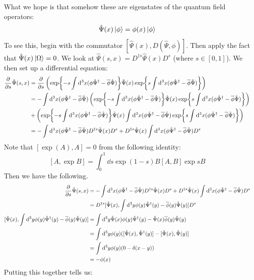 \documentclass{article}
\begin{document}
What we hope is that somehow these are eigenstates of the quantum field operators:
\begin{equation}
\hat\Psi(x)\ket{\phi} = \phi(x) \ket{\phi}
\end{equation}
To see this, begin with the commutator $[\hat\Psi(x),D(\hat\Psi,\phi)]$. Then apply the fact that $\hat\Psi(x)\ket{\Omega}=0$. We look at $\hat\Psi(s,x) = D^{\dagger s}\hat \Psi(x)D^s$ (where $s \in [0,1]$). We then set up a differential equation:
\begin{align*}
\pdv{s}\hat\Psi(s,x) &= \pdv{s}\left(\exp{-s\int \dd^3 x (\phi\hat\Psi^\dagger-\overline\phi\hat\Psi)} \hat\Psi(x) \exp{s\int \dd^3 x (\phi\hat\Psi^\dagger-\overline\phi\hat\Psi)}\right)\\
&= -\int \dd^3 x (\phi\hat\Psi^\dagger-\overline\phi\hat\Psi) \left(\exp{-s\int \dd^3 x (\phi\hat\Psi^\dagger-\overline\phi\hat\Psi)} \hat\Psi(x) \exp{s\int \dd^3 x (\phi\hat\Psi^\dagger-\overline\phi\hat\Psi)}\right)\\
&+\left(\exp{-s\int \dd^3 x (\phi\hat\Psi^\dagger-\overline\phi\hat\Psi)}\hat\Psi(x)  \int \dd^3 x (\phi\hat\Psi^\dagger-\overline\phi\hat\Psi) \exp{s\int \dd^3 x (\phi\hat\Psi^\dagger-\overline\phi\hat\Psi)}\right)\\
&= -\int \dd^3 x (\phi\hat\Psi^\dagger-\overline\phi\hat\Psi) D^{\dagger s} \hat\Psi(x)D^s+ D^{\dagger s}\hat\Psi(x)\int \dd^3 x (\phi\hat\Psi^\dagger-\overline\phi\hat\Psi)D^s
\end{align*}
Note that $[\exp(A),A] = 0$ from the following identity:
\[[A,\exp{B}]= \int_0^1 \dd s \exp{(1-s)B}[A,B]\exp{sB}\]
Then we have the following.
\begin{align*}
\pdv{s}\hat\Psi(s,x) &= -\int \dd^3 x (\phi\hat\Psi^\dagger-\overline\phi\hat\Psi) D^{\dagger s} \hat\Psi(x)D^s+ D^{\dagger s}\hat\Psi(x)\int \dd^3 x (\phi\hat\Psi^\dagger-\overline\phi\hat\Psi)D^s\\
&= D^{\dagger s} [\hat\Psi(x),\int \dd^3 y \phi(y)\hat\Psi^\dagger(y)-\overline\phi(y)\hat\Psi(y)]D^s\\
[\hat\Psi(x),\int \dd^3 y \phi(y)\hat\Psi^\dagger(y)-\overline\phi(y)\hat\Psi(y)] &= \int \dd^3 y \hat\Psi(x)\phi(y)\hat\Psi^\dagger(y)-\hat\Psi(x)\overline\phi(y)\hat\Psi(y)\\
&= \int\dd^3 y \phi(y)([\hat\Psi(x),\hat\Psi^\dagger(y)]-[\hat\Psi(x),\hat\Psi(y)]\\
&= \int \dd^3 y \phi(y)(0-\delta(x-y))\\
&= -\phi(x)
\end{align*}
Putting this together tells us:
\end{document}
